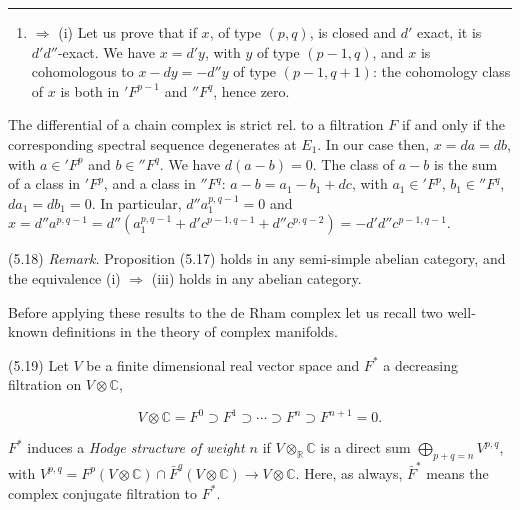 \documentclass[
  english,
  a3paper,
  a3paper]{extarticle}
\providecommand{\tightlist}{%
  \setlength{\itemsep}{0pt}\setlength{\parskip}{0pt}}
\begin{document}


\par

\vspace{0.7mm}\hrule\vspace{1.6mm}

\fontsize{9}{11}\selectfont

\begin{enumerate}
\def\labelenumi{(\roman{enumi})}
\setcounter{enumi}{2}
\tightlist
\item
  \(\Rightarrow\) (i) Let us prove that if \(x\), of type \((p,q)\), is
  closed and \(d'\) exact, it is \(d'd''\)-exact. We have \(x=d'y\),
  with \(y\) of type \((p-1,q)\), and \(x\) is cohomologous to
  \(x-dy=-d''y\) of type \((p-1,q+1)\): the cohomology class of \(x\) is
  both in \({}'F^{p-1}\) and \({}''F^q\), hence zero.
\end{enumerate}

The differential of a chain complex is strict rel. to a filtration \(F\)
if and only if the corresponding spectral sequence degenerates at
\(E_1\). In our case then, \(x=da=db\), with \(a\in{}'F^p\) and
\(b\in{}''F^q\). We have \(d(a-b)=0\). The class of \(a-b\) is the sum
of a class in \({}'F^p\), and a class in \({}''F^q\):
\(a-b=a_1-b_1+dc\), with \(a_1\in{}'F^p\), \(b_1\in{}''F^q\),
\(da_1=db_1=0\). In particular, \(d''a_1^{p,q-1}=0\) and
\(x=d''a^{p,q-1}=d''(a_1^{p,q-1}+d'c^{p-1,q-1}+d''c^{p,q-2})=-d'd''c^{p-1,q-1}\).

(5.18) \emph{Remark.} Proposition (5.17) holds in any semi-simple
abelian category, and the equivalence (i) \(\Rightarrow\) (iii) holds in
any abelian category.

Before applying these results to the de Rham complex let us recall two
well-known definitions in the theory of complex manifolds.

(5.19) Let \(V\) be a finite dimensional real vector space and \(F^*\) a
decreasing filtration on \(V\otimes\mathbb C\),

\[V\otimes\mathbb C=F^0\supset F^1\supset\cdots\supset F^n\supset F^{n+1}=0.\]

\(F^*\) induces a \emph{Hodge structure of weight \(n\)} if
\(V\otimes_{\mathbb R}\mathbb C\) is a direct sum
\(\bigoplus_{p+q=n}V^{p,q}\), with
\(V^{p,q}=F^p(V\otimes\mathbb C)\cap\bar F^q(V\otimes\mathbb C)\longrightarrow V\otimes\mathbb C\).
Here, as always, \(\bar F^*\) means the complex conjugate filtration to
\(F^*\).
\end{document}
